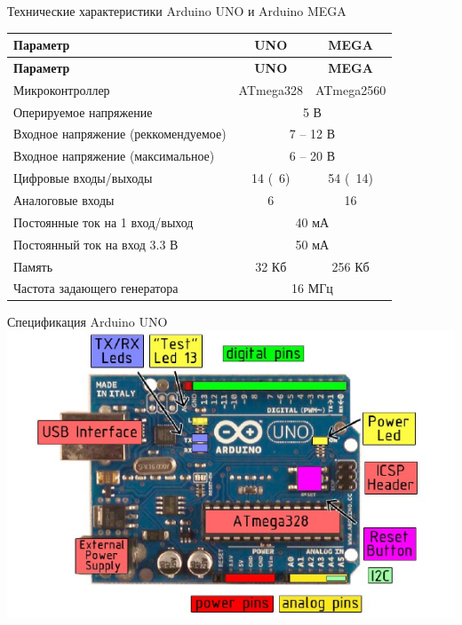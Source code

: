 \begin{frame}{Технические характеристики Arduino UNO и Arduino MEGA}
    \centering
    \begin{longtable}[c]{|p{2in}|c|c|}
        \hline
        \textbf{Параметр} & \textbf{UNO} & \textbf{MEGA}\\
        \hline
        \endfirsthead
        \hline
        \textbf{Параметр} & \textbf{UNO} & \textbf{MEGA}\\
        \hline
        \endhead
            Микроконтроллер & ATmega328 & ATmega2560\\
            \hline
            Оперируемое напряжение & \multicolumn{2}{c|}{5 В}\\
            \hline
            Входное напряжение (реккомендуемое) & \multicolumn{2}{c|}{7 -- 12 В}\\
            \hline
            Входное напряжение (максимальное) & \multicolumn{2}{c|}{6 -- 20 В}\\
            \hline
            Цифровые входы/выходы & 14 (~6) & 54 (~14)\\
            \hline
            Аналоговые входы & 6 & 16\\
            \hline
            Постоянные ток на 1 вход/выход & \multicolumn{2}{c|}{40 мА}\\
            \hline
            Постоянный ток на вход 3.3 В & \multicolumn{2}{c|}{50 мА}\\
            \hline
            Память & 32 Кб & 256 Кб\\
            \hline
            Частота задающего генератора & \multicolumn{2}{c|}{16 МГц}\\
            \hline
    \end{longtable}
\end{frame}

\begin{frame}{Спецификация Arduino UNO}
    \centering
    \includegraphics[width=.8\linewidth]{../Figures/specuno.png}
\end{frame}

